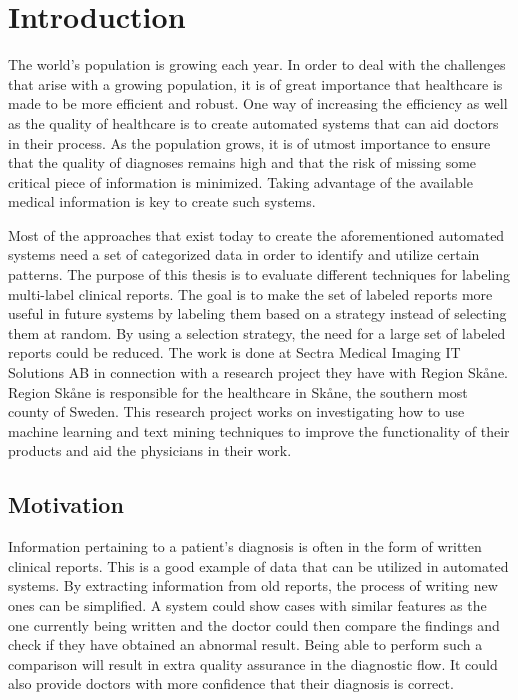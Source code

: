 \chapter{Introduction}
\label{cha:introduction}

The world's population is growing each year. 
In order to deal with the challenges that arise with a growing population, it is of great importance that healthcare is made to be more efficient and robust.
One way of increasing the efficiency as well as the quality of healthcare is to create automated systems that can aid doctors in their process.
As the population grows, it is of utmost importance to ensure that the quality of diagnoses remains high and that the risk of missing some critical piece of information is minimized.
Taking advantage of the available medical information is key to create such systems.

Most of the approaches that exist today to create the aforementioned automated systems need a set of categorized data in order to identify and utilize certain patterns.
The purpose of this thesis is to evaluate different techniques for labeling multi-label clinical reports.
The goal is to make the set of labeled reports more useful in future systems by labeling them based on a strategy instead of selecting them at random.
By using a selection strategy, the need for a large set of labeled reports could be reduced.
The work is done at Sectra Medical Imaging IT Solutions AB in connection with a research project they have with Region Skåne.
Region Skåne is responsible for the healthcare in Skåne, the southern most county of Sweden.
This research project works on investigating how to use machine learning and text mining techniques to improve the functionality of their products and aid the physicians in their work.

\section{Motivation}
\label{sec:motivation}

Information pertaining to a patient's diagnosis is often in the form of written clinical reports.
This is a good example of data that can be utilized in automated systems.
By extracting information from old reports, the process of writing new ones can be simplified.
A system could show cases with similar features as the one currently being written and the doctor could then compare the findings and check if they have obtained an abnormal result.
Being able to perform such a comparison will result in extra quality assurance in the diagnostic flow.
It could also provide doctors with more confidence that their diagnosis is correct.

